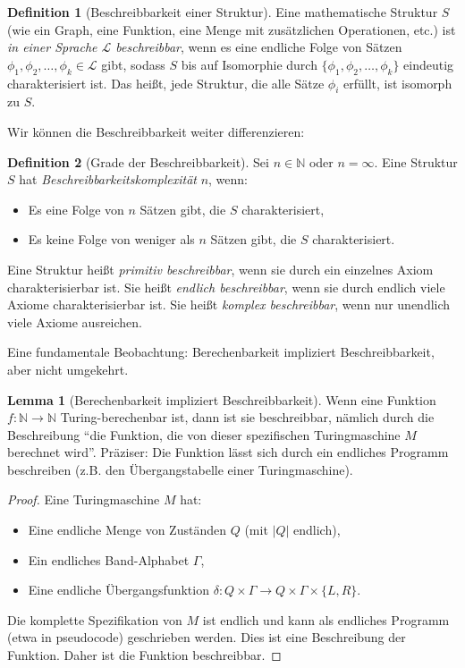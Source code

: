 \documentclass[a4paper,12pt]{article}
\theoremstyle{definition}
\newtheorem{definition}{Definition}
\newtheorem{lemma}{Lemma}
\begin{document}
\begin{definition}[Beschreibbarkeit einer Struktur]
Eine mathematische Struktur $S$ (wie ein Graph, eine Funktion, eine Menge mit zusätzlichen Operationen, etc.) ist \textit{in einer Sprache $\mathcal{L}$ beschreibbar}, wenn es eine endliche Folge von Sätzen $\phi_1, \phi_2, \ldots, \phi_k \in \mathcal{L}$ gibt, sodass $S$ bis auf Isomorphie durch $\{\phi_1, \phi_2, \ldots, \phi_k\}$ eindeutig charakterisiert ist. Das heißt, jede Struktur, die alle Sätze $\phi_i$ erfüllt, ist isomorph zu $S$.
\end{definition}

Wir können die Beschreibbarkeit weiter differenzieren:

\begin{definition}[Grade der Beschreibbarkeit]
Sei $n \in \mathbb{N}$ oder $n = \infty$. Eine Struktur $S$ hat \textit{Beschreibbarkeitskomplexität} $n$, wenn:
\begin{itemize}
\item Es eine Folge von $n$ Sätzen gibt, die $S$ charakterisiert,
\item Es keine Folge von weniger als $n$ Sätzen gibt, die $S$ charakterisiert.
\end{itemize}

Eine Struktur heißt \textit{primitiv beschreibbar}, wenn sie durch ein einzelnes Axiom charakterisierbar ist. Sie heißt \textit{endlich beschreibbar}, wenn sie durch endlich viele Axiome charakterisierbar ist. Sie heißt \textit{komplex beschreibbar}, wenn nur unendlich viele Axiome ausreichen.
\end{definition}

Eine fundamentale Beobachtung: Berechenbarkeit impliziert Beschreibbarkeit, aber nicht umgekehrt.

\begin{lemma}[Berechenbarkeit impliziert Beschreibbarkeit]
Wenn eine Funktion $f: \mathbb{N} \to \mathbb{N}$ Turing-berechenbar ist, dann ist sie beschreibbar, nämlich durch die Beschreibung ``die Funktion, die von dieser spezifischen Turingmaschine $M$ berechnet wird''. Präziser: Die Funktion lässt sich durch ein endliches Programm beschreiben (z.B. den Übergangstabelle einer Turingmaschine).
\end{lemma}

\begin{proof}
Eine Turingmaschine $M$ hat:
\begin{itemize}
\item Eine endliche Menge von Zuständen $Q$ (mit $|Q|$ endlich),
\item Ein endliches Band-Alphabet $\Gamma$,
\item Eine endliche Übergangsfunktion $\delta: Q \times \Gamma \to Q \times \Gamma \times \{L, R\}$.
\end{itemize}

Die komplette Spezifikation von $M$ ist endlich und kann als endliches Programm (etwa in pseudocode) geschrieben werden. Dies ist eine Beschreibung der Funktion. Daher ist die Funktion beschreibbar.
\end{proof}
\end{document}
